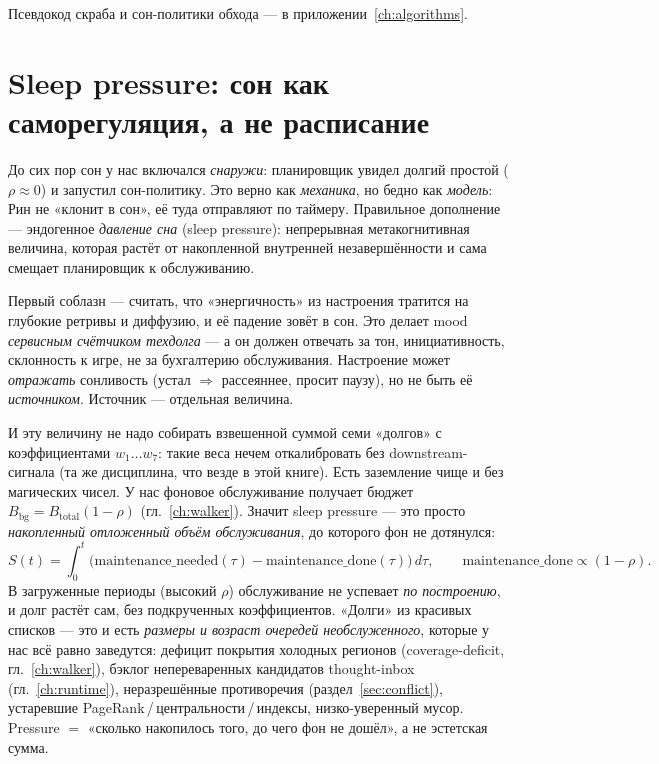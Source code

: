 Псевдокод скраба и сон-политики обхода — в приложении~\ref{ch:algorithms}.

\section{Sleep pressure: сон как саморегуляция, а не расписание}
\label{sec:sleeppressure}

До сих пор сон у нас включался \emph{снаружи}: планировщик увидел долгий простой
($\rho\approx0$) и запустил сон-политику. Это верно как \emph{механика}, но бедно как
\emph{модель}: Рин не «клонит в сон», её туда отправляют по таймеру. Правильное
дополнение — эндогенное \emph{давление сна} (sleep pressure): непрерывная
метакогнитивная величина, которая растёт от накопленной внутренней незавершённости и
сама смещает планировщик к обслуживанию.

\begin{principle}
Первый соблазн — считать, что «энергичность» из настроения тратится на глубокие ретривы
и диффузию, и её падение зовёт в сон. Это делает mood \emph{сервисным счётчиком
техдолга} — а он должен отвечать за тон, инициативность, склонность к игре, не за
бухгалтерию обслуживания. Настроение может \emph{отражать} сонливость (устал $\Rightarrow$
рассеяннее, просит паузу), но не быть её \emph{источником}. Источник — отдельная величина.
\end{principle}

И эту величину не надо собирать взвешенной суммой семи «долгов» с коэффициентами
$w_1\ldots w_7$: такие веса нечем откалибровать без downstream-сигнала (та же дисциплина,
что везде в этой книге). Есть заземление чище и без магических чисел. У нас фоновое
обслуживание получает бюджет $B_{\text{bg}}=B_{\text{total}}(1-\rho)$
(гл.~\ref{ch:walker}). Значит sleep pressure — это просто \emph{накопленный отложенный
объём обслуживания}, до которого фон не дотянулся:
\begin{equation}
S(t)=\int_0^t\Big(\text{maintenance\_needed}(\tau)-\text{maintenance\_done}(\tau)\Big)\,d\tau,
\qquad \text{maintenance\_done}\propto(1-\rho).
\label{eq:sleeppressure}
\end{equation}
В загруженные периоды (высокий $\rho$) обслуживание не успевает \emph{по построению}, и
долг растёт сам, без подкрученных коэффициентов. «Долги» из красивых списков — это и есть
\emph{размеры и возраст очередей необслуженного}, которые у нас всё равно заведутся:
дефицит покрытия холодных регионов (coverage-deficit, гл.~\ref{ch:walker}), бэклог
непереваренных кандидатов thought-inbox (гл.~\ref{ch:runtime}), неразрешённые
противоречия (раздел~\ref{sec:conflict}), устаревшие PageRank\,/\,центральности\,/\,индексы,
низко-уверенный мусор. Pressure $=$ «сколько накопилось того, до чего фон не дошёл», а не
эстетская сумма.

